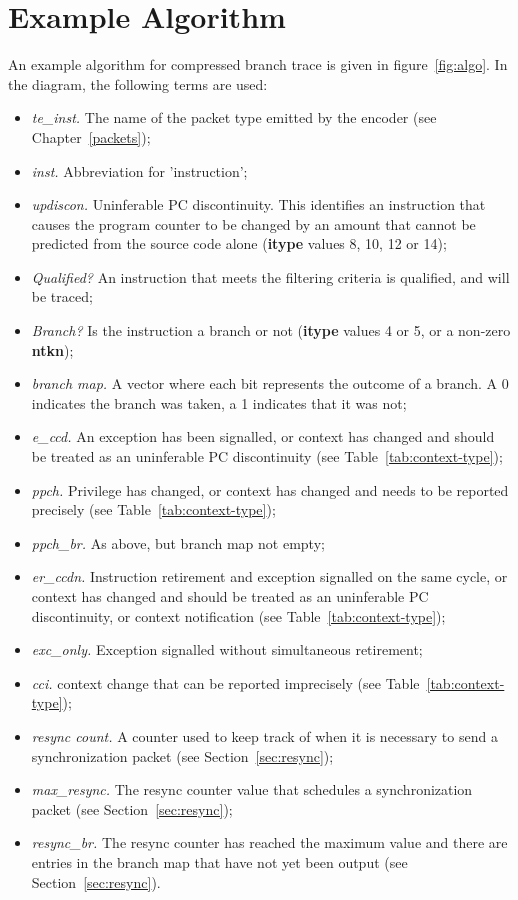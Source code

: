 \chapter{Example Algorithm} \label{Algorithm}

An example algorithm for compressed branch trace is given in figure~\ref{fig:algo}. 
In the diagram, the following terms are used:

\begin{itemize}
  \item \textit{te\_inst.} The name of the packet type emitted by the encoder (see Chapter~\ref{packets});
  \item \textit{inst.}  Abbreviation for 'instruction';
  \item \textit{updiscon.}  Uninferable PC discontinuity.  This identifies an instruction that
    causes the program counter to be changed by an amount that cannot be predicted from the
    source code alone (\textbf{itype} values 8, 10, 12 or 14);
  \item \textit{Qualified?}  An instruction that meets the filtering criteria is qualified, and will be traced;
  \item \textit{Branch?} Is the instruction a branch or not (\textbf{itype} values 4 or 5, or a non-zero \textbf{ntkn});
  \item \textit{branch map.}  A vector where each bit represents the outcome of a branch.  A 0 indicates the
    branch was taken, a 1 indicates that it was not;
  \item \textit{e\_ccd.} An exception has been signalled, or context has changed and
    should be treated as an uninferable PC discontinuity (see Table~\ref{tab:context-type});
  \item \textit{ppch.} Privilege has changed, or context has changed and needs to be 
    reported precisely (see Table~\ref{tab:context-type});
  \item \textit{ppch\_br.} As above, but branch map not empty;
  \item \textit{er\_ccdn.}  Instruction retirement and exception signalled on the same cycle, 
    or context has changed and should be treated as an uninferable PC discontinuity, or
    context notification (see Table~\ref{tab:context-type});
  \item \textit{exc\_only.}  Exception signalled without simultaneous retirement;
  \item \textit{cci.}  context change that can be reported imprecisely (see Table~\ref{tab:context-type});
  \item \textit{resync count.} A counter used to keep track of when it is necessary to send 
    a synchronization packet (see Section~\ref{sec:resync});
  \item \textit{max\_resync.}  The resync counter value that schedules a synchronization packet (see Section~\ref{sec:resync});
  \item \textit{resync\_br.} The resync counter has reached the maximum value and there are
    entries in the branch map that have not yet been output (see Section~\ref{sec:resync}).
\end{itemize}

